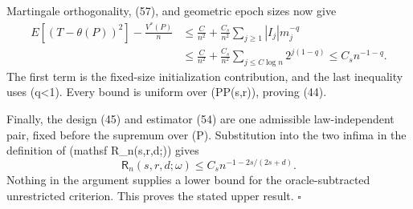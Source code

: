 Martingale orthogonality, (57), and geometric epoch sizes now give
\[
\begin{aligned}
E[(T-\theta(P))^2]-\frac{V^*(P)}n
&\leq\frac{C}{n^2}
+\frac{C_s}{n^2}\sum_{j\geq1}|I_j|m_j^{-q}\\
&\leq\frac{C}{n^2}
+\frac{C_s}{n^2}\sum_{j\leq C\log n}2^{j(1-q)}
\leq C_s n^{-1-q}.
\tag{58}
\end{aligned}
\]
The first term is the fixed-size initialization contribution, and the last inequality uses (q<1).  Every bound is uniform over (P\in\mathcal P(s,r)), proving (44).

Finally, the design (45) and estimator (54) are one admissible law-independent pair, fixed before the supremum over (P).  Substitution into the two infima in the definition of (mathsf R_n(s,r,d;\omega)) gives
\[
\mathsf R_n(s,r,d;\omega)\leq C_s n^{-1-2s/(2s+d)}.
\]
Nothing in the argument supplies a lower bound for the oracle-subtracted unrestricted criterion.  This proves the stated upper result. \(\square\)